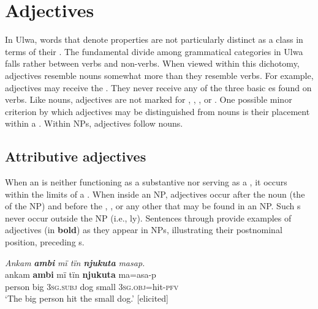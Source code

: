 \chapter{Adjectives}\label{sec:5}


In Ulwa, words that denote properties are not particularly  distinct as a class in terms of their . The fundamental divide among grammatical categories in Ulwa falls rather between verbs and non-verbs. When viewed within this dichotomy, adjectives resemble nouns somewhat more than they resemble verbs. For example, adjectives may receive the . They never receive any of the three basic  es found on verbs. Like nouns, adjectives are not marked for , , , or . One possible minor criterion by which adjectives may be distinguished from nouns is their placement within a . Within NPs, adjectives follow nouns.


\section{Attributive adjectives}\label{sec:5.1}


When an  is neither functioning as a substantive nor serving as a , it occurs within the limits of a . When inside an NP, adjectives occur after the noun (the  of the NP) and before the , , or any other  that may be found in an NP. Such s never occur outside the NP (i.e., ly). Sentences  through  provide examples of adjectives (in \textbf{bold}) as they appear in NPs, illustrating their postnominal position, preceding s.

\ea%
    \label{ex:adj:1}
            \textit{Ankam} \textbf{\textit{ambi}} \textit{mï tïn} \textbf{\textit{njukuta}} \textit{masap.}\\
\gll    ankam  \textbf{ambi}  mï      tïn    \textbf{njukuta}  ma=asa-p\\
    person  big    3\textsc{sg.subj}  dog  small    3\textsc{sg.obj=}hit\textsc{{}-pfv}\\
\glt `The big person hit the small dog.’ [elicited]
\z

